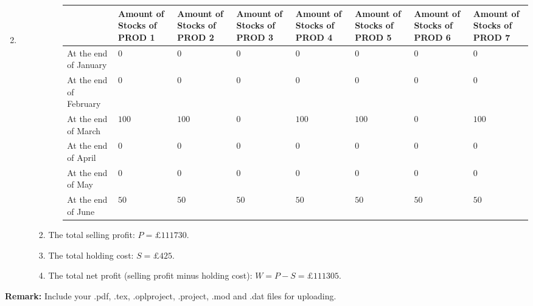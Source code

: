\documentclass[12pt,a4paper]{article}
\makeatletter
\newtheorem*{solution}{Solution}
\theoremstyle{definition}
\renewenvironment{solution}[1][Solution] {\par\pushQED{\qed}\normalfont\topsep6\p@\@plus6\p@\relax\trivlist\item[\hskip\labelsep\bfseries#1\@addpunct{.}]\ignorespaces}{\popQED\endtrivlist\@endpefalse} \makeatother
\makeatother
\begin{document}
\begin{enumerate}
\begin{solution}
\begin{enumerate}
\begin{enumerate}
\begin{enumerate}
\begin{table}[htbp]
    		\scriptsize
    		\centering
    		\renewcommand\arraystretch{1.1}
    		\begin{tabular}{m{} m{}<{\centering} m{}<{\centering} m{}<{\centering} m{}<{\centering} m{}<{\centering} m{}<{\centering} m{}<{\centering}}
    			\hline
    			& \textbf{Amount of Stocks of PROD 1} & \textbf{Amount of Stocks of PROD 2} & \textbf{Amount of Stocks of PROD 3} & \textbf{Amount of Stocks of PROD 4} & \textbf{Amount of Stocks of PROD 5} & \textbf{Amount of Stocks of PROD 6} &  \textbf{Amount of Stocks of PROD 7} \\\hline
    			At the end of January & $0$ & $0$ & $0$ & $0$ & $0$ & $0$ & $0$ \\
    			At the end of February & $0$ & $0$ & $0$ & $0$ & $0$ & $0$ & $0$ \\
    			At the end of March & $100$ & $100$ & $0$ & $100$ & $100$ & $0$ & $100$ \\
    			At the end of April & $0$ & $0$ & $0$ & $0$ & $0$ & $0$ & $0$ \\
    			At the end of May & $0$ & $0$ & $0$ & $0$ & $0$ & $0$ & $0$ \\
    			At the end of June & $50$ & $50$ & $50$ & $50$ & $50$ & $50$ & $50$ \\
    			\hline
    		\end{tabular}
    	\end{table}
			\end{enumerate}
			\item
			The total selling profit: $P = \pounds 111730$.
			\item
			The total holding cost: $S = \pounds 425$.
			\item
			The total net profit (selling profit minus holding cost): $W = P - S = \pounds 111305$.
		\end{enumerate}
    \end{enumerate}
	\end{solution}
\end{enumerate}



\textbf{Remark:} Include your .pdf, .tex, .oplproject, .project, .mod and .dat files for uploading.


\end{document}
